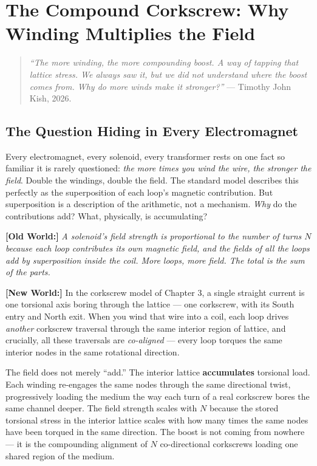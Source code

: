 \documentclass[11pt, letterpaper, openany]{book}
\newcommand{\oldworld}[1]{\noindent\textbf{\color{goldseal}[Old World:]}
  \textit{#1}\medskip}
\newcommand{\newworldcmd}[1]{\noindent\textbf{\color{kishblue}[New World:]}
  #1\medskip}
\begin{document}
\clearpage
 
\chapter{The Compound Corkscrew: Why Winding Multiplies the Field}
 
\begin{quote}
\textit{``The more winding, the more compounding boost. A way of tapping
that lattice stress. We always saw it, but we did not understand where the
boost comes from. Why do more winds make it stronger?''}
--- Timothy John Kish, 2026.
\end{quote}
 
\section{The Question Hiding in Every Electromagnet}
 
Every electromagnet, every solenoid, every transformer rests on one fact
so familiar it is rarely questioned: \emph{the more times you wind the
wire, the stronger the field}. Double the windings, double the field. The
standard model describes this perfectly as the superposition of each
loop's magnetic contribution. But superposition is a description of the
arithmetic, not a mechanism. \emph{Why} do the contributions add? What,
physically, is accumulating?
 
\oldworld{A solenoid's field strength is proportional to the number of
turns $N$ because each loop contributes its own magnetic field, and the
fields of all the loops add by superposition inside the coil. More loops,
more field. The total is the sum of the parts.}
 
\newworldcmd{In the corkscrew model of Chapter 3, a single straight current
is one torsional axis boring through the lattice --- one corkscrew, with
its South entry and North exit. When you wind that wire into a coil, each
loop drives \emph{another} corkscrew traversal through the same interior
region of lattice, and crucially, all these traversals are \emph{co-aligned}
--- every loop torques the same interior nodes in the same rotational
direction.
 
The field does not merely ``add.'' The interior lattice \textbf{accumulates}
torsional load. Each winding re-engages the same nodes through the same
directional twist, progressively loading the medium the way each turn of a
real corkscrew bores the same channel deeper. The field strength scales
with $N$ because the stored torsional stress in the interior lattice scales
with how many times the same nodes have been torqued in the same direction.
The boost is not coming from nowhere --- it is the compounding alignment of
$N$ co-directional corkscrews loading one shared region of the medium.}
 
\end{document}
